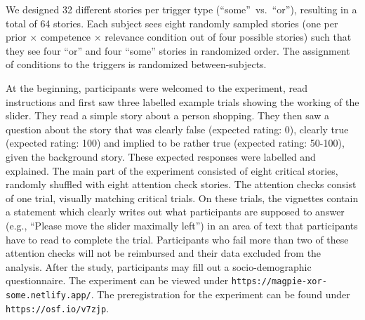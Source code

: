 \documentclass{sp}
\begin{document}
 We designed 32 different stories per trigger type (``some''~vs.~``or''), resulting in a total of 64 stories. Each subject sees eight randomly sampled stories (one per prior $\times$ competence $\times$ relevance condition out of four possible stories) such that they see four ``or'' and four ``some'' stories in randomized order. The assignment of conditions to the triggers is randomized between-subjects.

At the beginning, participants were welcomed to the experiment, read instructions and first saw three labelled example trials showing the working of the slider. They read a simple story about a person shopping. They then saw a question about the story that was clearly false (expected rating: 0), clearly true (expected rating: 100) and implied to be rather true (expected rating: 50-100), given the background story. These expected responses were labelled and explained.  
The main part of the experiment consisted of eight critical stories, randomly shuffled with eight attention check stories. The attention checks consist of one trial, visually matching critical trials. On these trials, the vignettes contain a statement which clearly writes out what participants are supposed to answer (e.g., ``Please move the slider maximally left'') in an area of text that participants have to read to complete the trial. Participants who fail more than two of these attention checks will not be reimbursed and their data excluded from the analysis. 
After the study, participants may fill out a socio-demographic questionnaire.
The experiment can be viewed under \texttt{https://magpie-xor-some.netlify.app/}. The preregistration for the experiment can be found under \texttt{https://osf.io/v7zjp}.
\end{document}
